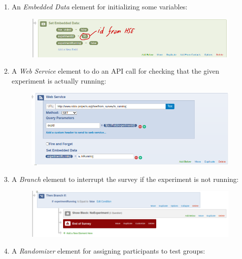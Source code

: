 \documentclass[fleqn]{article}
\begin{document}
\begin{enumerate}

\item
    An \emph{Embedded Data} element for initializing some variables:

    \begin{figure} [h]
    \centering
    \includegraphics[width=.9\textwidth]{img/qflow1}
    \label{fig:qflow1} 
    \end{figure}

\item
    A \emph{Web Service} element to do an API call for checking that the given experiment is actually running:

    \begin{figure} [h]
    \centering
    \includegraphics[width=.9\textwidth]{img/qflow2}
    \label{fig:qflow1} 
    \end{figure}

\newpage

\item
    A \emph{Branch} element to interrupt the survey if the experiment is not running:

    \begin{figure} [h]
    \centering
    \includegraphics[width=.9\textwidth]{img/qflow3}
    \label{fig:qflow1} 
    \end{figure}

\item
    A \emph{Randomizer} element for assigning participants to test groups:


\end{enumerate}
\end{document}
